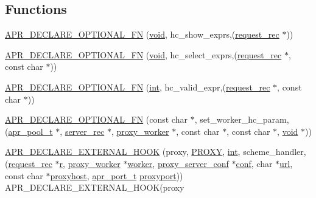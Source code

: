 \subsection*{Functions}
\begin{DoxyCompactItemize}
\item 
\hyperlink{group__MOD__PROXY_gaadcda6f6797dcacf90c8433bf55ba0fd}{A\+P\+R\+\_\+\+D\+E\+C\+L\+A\+R\+E\+\_\+\+O\+P\+T\+I\+O\+N\+A\+L\+\_\+\+FN} (\hyperlink{group__MOD__ISAPI_gacd6cdbf73df3d9eed42fa493d9b621a6}{void}, hc\+\_\+show\+\_\+exprs,(\hyperlink{structrequest__rec}{request\+\_\+rec} $\ast$))
\item 
\hyperlink{group__MOD__PROXY_gad2f1d8b661d804fedbdb754f7e72fbcc}{A\+P\+R\+\_\+\+D\+E\+C\+L\+A\+R\+E\+\_\+\+O\+P\+T\+I\+O\+N\+A\+L\+\_\+\+FN} (\hyperlink{group__MOD__ISAPI_gacd6cdbf73df3d9eed42fa493d9b621a6}{void}, hc\+\_\+select\+\_\+exprs,(\hyperlink{structrequest__rec}{request\+\_\+rec} $\ast$, const char $\ast$))
\item 
\hyperlink{group__MOD__PROXY_ga4e33b91754f2ad829eccc7a49a917113}{A\+P\+R\+\_\+\+D\+E\+C\+L\+A\+R\+E\+\_\+\+O\+P\+T\+I\+O\+N\+A\+L\+\_\+\+FN} (\hyperlink{pcre_8txt_a42dfa4ff673c82d8efe7144098fbc198}{int}, hc\+\_\+valid\+\_\+expr,(\hyperlink{structrequest__rec}{request\+\_\+rec} $\ast$, const char $\ast$))
\item 
\hyperlink{group__MOD__PROXY_ga0e934f5f480aebbd8eeb7eb3704c8368}{A\+P\+R\+\_\+\+D\+E\+C\+L\+A\+R\+E\+\_\+\+O\+P\+T\+I\+O\+N\+A\+L\+\_\+\+FN} (const char $\ast$, set\+\_\+worker\+\_\+hc\+\_\+param,(\hyperlink{structapr__pool__t}{apr\+\_\+pool\+\_\+t} $\ast$, \hyperlink{structserver__rec}{server\+\_\+rec} $\ast$, \hyperlink{structproxy__worker}{proxy\+\_\+worker} $\ast$, const char $\ast$, const char $\ast$, \hyperlink{group__MOD__ISAPI_gacd6cdbf73df3d9eed42fa493d9b621a6}{void} $\ast$))
\item 
\hyperlink{group__MOD__PROXY_ga5f4dcb8ff23e4d7031c8c6c659da8c54}{A\+P\+R\+\_\+\+D\+E\+C\+L\+A\+R\+E\+\_\+\+E\+X\+T\+E\+R\+N\+A\+L\+\_\+\+H\+O\+OK} (proxy, \hyperlink{group__MOD__PROXY_ga8a2d0523d70a5ec877fe8d89ef4ecd96}{P\+R\+O\+XY}, \hyperlink{pcre_8txt_a42dfa4ff673c82d8efe7144098fbc198}{int}, scheme\+\_\+handler,(\hyperlink{structrequest__rec}{request\+\_\+rec} $\ast$\hyperlink{pcregrep_8txt_a2e9e9438b26c0bb4425367a7e4f75eb3}{r}, \hyperlink{structproxy__worker}{proxy\+\_\+worker} $\ast$\hyperlink{group__MOD__PROXY_gad62a732febc2b789c7a84e2fdb3c5aa8}{worker}, \hyperlink{structproxy__server__conf}{proxy\+\_\+server\+\_\+conf} $\ast$\hyperlink{group__MOD__PROXY_ga4d7edd451c4bb8ed9ce9012e5dea2b14}{conf}, char $\ast$\hyperlink{group__APR__Util__Escaping_gaec657bef26e5ff27b9442563a591d9ec}{url}, const char $\ast$\hyperlink{ab_8c_aae574ff365697003c4add905b7c379e2}{proxyhost}, \hyperlink{group__apr__network__io_gaa670a71960f6eb4fe0d0de2a1e7aba03}{apr\+\_\+port\+\_\+t} \hyperlink{ab_8c_aafd282ad1fd2b2937f45c1cd22f143da}{proxyport})) A\+P\+R\+\_\+\+D\+E\+C\+L\+A\+R\+E\+\_\+\+E\+X\+T\+E\+R\+N\+A\+L\+\_\+\+H\+O\+OK(proxy

\end{DoxyCompactItemize}
